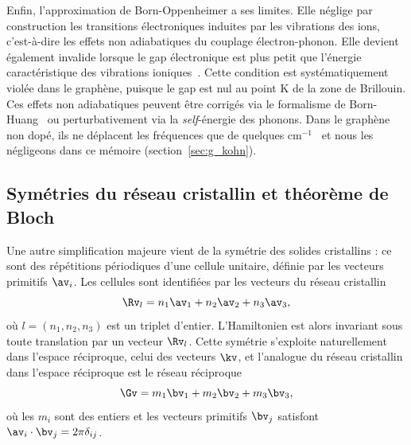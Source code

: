 Enfin, l'approximation de Born-Oppenheimer a ses limites. Elle néglige par construction les transitions électroniques induites par les vibrations des ions, c'est-à-dire les effets non adiabatiques du couplage électron-phonon. Elle devient également invalide lorsque le gap électronique est plus petit que l'énergie caractéristique des vibrations ioniques~\cite{pisanaBornOppenheimerBreakdownGraphene2007}. Cette condition est systématiquement violée dans le graphène, puisque le gap est nul au point K de la zone de Brillouin. Ces effets non adiabatiques peuvent être corrigés via le formalisme de Born-Huang~\cite{bornDynamicalTheoryCrystal1998} ou perturbativement via la \textit{self}-énergie des phonons. Dans le graphène non dopé, ils ne déplacent les fréquences que de quelques cm$^{-1}$~\cite{lazzeriNonadiabaticKohnanomalyDoped2006} et nous les négligeons dans ce mémoire (section~\ref{sec:g_kohn}).

\subsection{Symétries du réseau cristallin et théorème de Bloch}\label{sec:symétries}

Une autre simplification majeure vient de la symétrie des solides cristallins : ce sont des répétitions périodiques d'une cellule unitaire, définie par les vecteurs primitifs $\av_i$. Les cellules sont identifiées par les vecteurs du réseau cristallin
\begin{equation}
    \Rv_l = n_1\av_1+n_2\av_2+n_3\av_3,\label{eqn:c2_Rl}
\end{equation}
où $l=(n_1,n_2,n_3)$ est un triplet d'entier. L'Hamiltonien est alors invariant sous toute translation par un vecteur $\Rv_l$. Cette symétrie s'exploite naturellement dans l'espace réciproque, celui des vecteurs $\kv$, et l'analogue du réseau cristallin dans l'espace réciproque est le réseau réciproque
\begin{equation}
    \Gv = m_1\bv_1+m_2\bv_2+m_3\bv_3,
    \label{eqn:c2_G}
\end{equation}
où les $m_i$ sont des entiers et les vecteurs primitifs $\bv_j$ satisfont $\av_i\cdot\bv_j=2\pi\delta_{ij}$.

